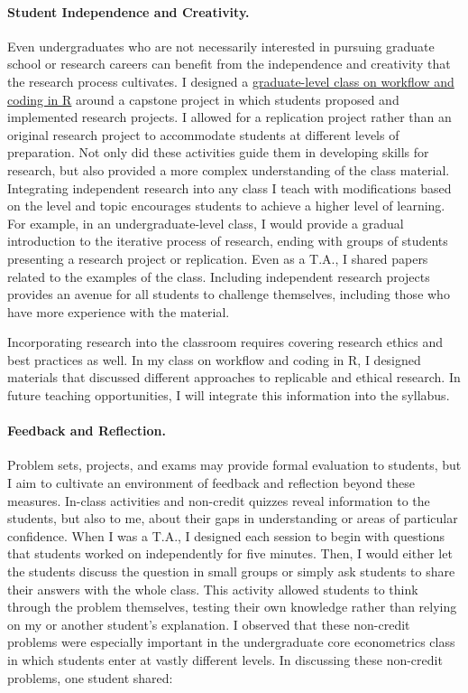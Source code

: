 \paragraph{Student Independence and Creativity.} Even undergraduates who are not necessarily interested in pursuing graduate school or research careers can benefit from the independence and creativity that the research process cultivates. I designed a \href{https://github.com/aziff/R-Workflow-for-Economists}{graduate-level class on workflow and coding in R} around a capstone project in which students proposed and implemented research projects. I allowed for a replication project rather than an original research project to accommodate students at different levels of preparation. Not only did these activities guide them in developing skills for research, but also provided a more complex understanding of the class material. Integrating independent research into any class I teach with modifications based on the level and topic encourages students to achieve a higher level of learning. For example, in an undergraduate-level class, I would provide a gradual introduction to the iterative process of research, ending with groups of students presenting a research project or replication. Even as a T.A., I shared papers related to the examples of the class. Including independent research projects provides an avenue for all students to challenge themselves, including those who have more experience with the material. 

Incorporating research into the classroom requires covering research ethics and best practices as well. In my class on workflow and coding in R, I designed materials that discussed different approaches to replicable and ethical research. In future teaching opportunities, I will integrate this information into the syllabus.

\paragraph{Feedback and Reflection.} Problem sets, projects, and exams may provide formal evaluation to students, but I aim to cultivate an environment of feedback and reflection beyond these measures. In-class activities and non-credit quizzes reveal information to the students, but also to me, about their gaps in understanding or areas of particular confidence. When I was a T.A., I designed each session to begin with questions that students worked on independently for five minutes. Then, I would either let the students discuss the question in small groups or simply ask students to share their answers with the whole class. This activity allowed students to think through the problem themselves, testing their own knowledge rather than relying on my or another student's explanation. I observed that these non-credit problems were especially important in the undergraduate core econometrics class in which students enter at vastly different levels. In discussing these non-credit problems, one student shared:

